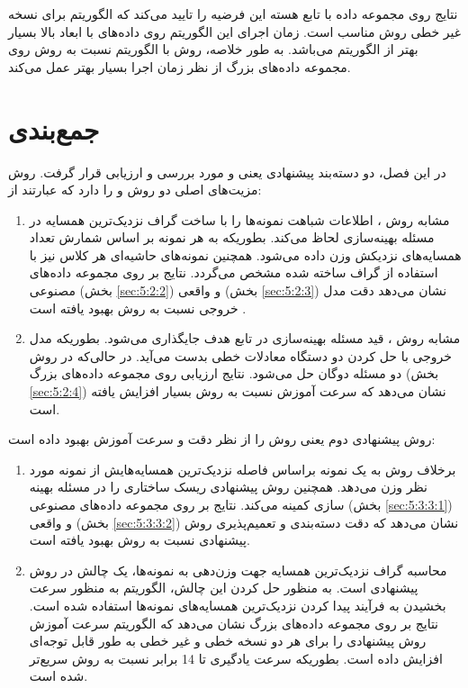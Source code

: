نتایج روی مجموعه داده  با تابع هسته  این فرضیه را تایید می‌کند که الگوریتم  برای نسخه غیر خطی روش   مناسب است. زمان اجرای این الگوریتم روی داده‌های با ابعاد بالا بسیار بهتر از الگوریتم  می‌باشد. به طور خلاصه، روش  با الگوریتم  نسبت به روش  روی مجموعه داده‌های بزرگ از نظر زمان اجرا بسیار بهتر عمل می‌کند.

\section{جمع‌بندی}\label{sec:5:4}
در این فصل، دو دسته‌بند پیشنهادی یعنی  و  مورد بررسی و ارزیابی قرار گرفت. روش  مزیت‌های اصلی دو روش  و  را دارد که عبارتند از:
\begin{enumerate}
	\item مشابه روش ، اطلاعات شباهت نمونه‌ها را با ساخت گراف نزدیک‌ترین همسایه در مسئله بهینه‌سازی لحاظ می‌کند. بطوریکه به هر نمونه بر اساس شمارش تعداد همسایه‌های نزدیکش وزن داده می‌شود. همچنین نمونه‌های حاشیه‌ای هر کلاس نیز با استفاده از گراف ساخته شده مشخص می‌گردد.  نتایج بر روی مجموعه داده‌های مصنوعی (بخش \ref{sec:5:2:2}) و واقعی (بخش \ref{sec:5:2:3}) نشان می‌دهد دقت مدل خروجی نسبت به روش  بهبود یافته است .
	\item مشابه روش ، قید مسئله بهینه‌سازی در تابع هدف جایگذاری می‌شود. بطوریکه مدل خروجی با حل کردن دو دستگاه معادلات خطی بدست می‌آید. در حالی‌که در روش   دو مسئله دوگان حل می‌شود. نتایج ارزیابی روی مجموعه داده‌های بزرگ  (بخش \ref{sec:5:2:4}) نشان می‌دهد که سرعت آموزش نسبت به روش  بسیار افزایش یافته است.    
\end{enumerate}

روش پیشنهادی دوم یعنی  روش  را از نظر دقت و سرعت آموزش بهبود داده است:
\begin{enumerate}
	\itemsep0em
	\item {} برخلاف روش   به یک نمونه براساس فاصله نزدیک‌ترین همسایه‌هایش از نمونه مورد نظر وزن می‌دهد. همچنین روش پیشنهادی ریسک ساختاری را در مسئله بهینه سازی کمینه می‌کند. نتایج بر روی مجموعه داده‌های مصنوعی  (بخش \ref{sec:5:3:3:1}) و واقعی (بخش  \ref{sec:5:3:3:2}) نشان می‌دهد که دقت دسته‌بندی و تعمیم‌پذیری روش پیشنهادی نسبت به روش  بهبود یافته است.
	\item محاسبه گراف نزدیک‌ترین همسایه جهت وزن‌دهی به نمونه‌ها، یک چالش در روش پیشنهادی است. به منظور حل کردن این چالش، الگوریتم   به منظور سرعت بخشیدن به فرآیند پیدا کردن نزدیک‌ترین همسایه‌های نمونه‌ها استفاده شده است. نتایج بر روی مجموعه داده‌های بزرگ نشان می‌دهد که الگوریتم   سرعت آموزش روش پیشنهادی را برای هر دو نسخه خطی و غیر خطی به طور قابل    توجه‌ای افزایش داده است. بطوریکه سرعت یادگیری تا 14 برابر نسبت به روش  سریع‌تر شده است.
\end{enumerate}

